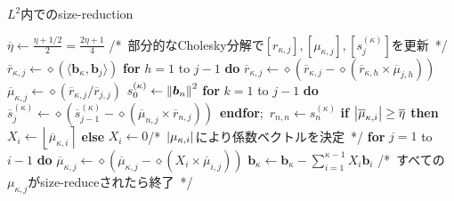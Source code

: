 \documentclass[12pt,aspectratio=169,xcolor=dvipsnames,table,dvipdfmx, leqno]{beamer}
\renewcommand{\Comment}[1]{\quad/*~#1~*/}
\newcommand{\round}[1]{\left\lfloor #1 \right\rceil}
\begin{document}
\begin{frame}{}
\begin{algorithm}[H]
    \footnotesize
    \begin{algorithmic}[1]
        \caption{\footnotesize $L^2$内でのsize-reduction}
        \label{alg_size_L2}
        \State $\overline{\eta}\gets\frac{\eta+1/2}{2}=\frac{2\eta+1}{4}$
        \Do
            \Comment{部分的なCholesky分解で$[r_{\kappa, j}], [\mu_{\kappa, j}], [s_{j}^{(\kappa)}]$を更新}
                \State $\overline{r}_{\kappa, j}\gets \diamond(\langle\bm{b}_\kappa, \bm{b}_j\rangle)$
                \State \textbf{for} $h=1$ to $j-1$ \textbf{do} $\overline{r}_{\kappa, j}\gets \diamond(\overline{r}_{\kappa, j}-\diamond(\overline{r}_{\kappa, h}\times\overline{\mu}_{j, h}))$
                \State $\overline{\mu}_{\kappa, j}\gets \diamond(\overline{r}_{\kappa, j}/\overline{r}_{j, j})$
            \EndFor
            \State $s_0^{(\kappa)}\gets \norm{\bm{b}_n}^2$
            \State \textbf{for} $k = 1$ to $j-1$ \textbf{do} $\overline{s}_j^{(\kappa)}\gets \diamond(\overline{s}_{j-1}^{(\kappa)}-\diamond(\overline{\mu}_{n, j}\times\overline{r}_{n, j}))$~\textbf{endfor};~$r_{n, n}\gets s_n^{(\kappa)}$
                \State \textbf{if} $\abs{\overline{\mu}_{\kappa, i}}\ge \overline{\eta}$ \textbf{then} $X_i\gets \round{\overline{\mu}_{\kappa, i}}$ \textbf{else} $X_i\gets 0$\Comment{$\abs{\mu_{\kappa, i}}$により係数ベクトルを決定}
                \State \textbf{for} $j=1$ to $i-1$ \textbf{do} $\overline{\mu}_{\kappa, j}\gets \diamond(\overline{\mu}_{\kappa, j}-\diamond(X_i\times\overline{\mu}_{i, j}))$
            \EndFor
            \State $\bm{b}_\kappa\gets \bm{b}_\kappa-\sum_{i=1}^{\kappa-1}X_i\bm{b}_i$
        \Comment{すべての$\mu_{\kappa, j}$がsize-reduceされたら終了}
    \end{algorithmic}
\end{algorithm}
\end{frame}
\end{document}
